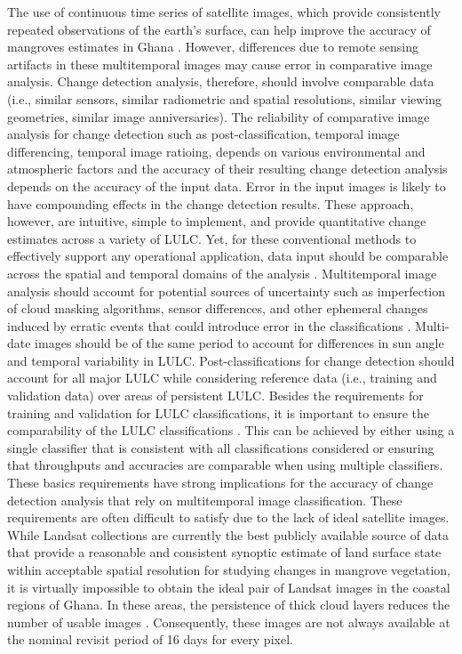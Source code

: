 \documentclass[12pt,oneside,preprint,3p,authoryear,times]{elsarticle} %
\begin{document}
The use of continuous time series of satellite images, which provide
consistently repeated observations of the earth's surface, can help
improve the accuracy of mangroves estimates in Ghana
\citep{Lambin-and-Strahlers-1994, Verbesselt-et-al-2010, Zhu-and-Woodcock-2014}.
However, differences due to remote sensing artifacts in these
multitemporal images may cause error in comparative image analysis.
Change detection analysis, therefore, should involve comparable data
(i.e., similar sensors, similar radiometric and spatial resolutions,
similar viewing geometries, similar image anniversaries). The
reliability of comparative image analysis for change detection such as
post-classification, temporal image differencing, temporal image
ratioing, depends on various environmental and atmospheric factors and
the accuracy of their resulting change detection analysis depends on the
accuracy of the input data. Error in the input images is likely to have
compounding effects in the change detection results. These approach,
however, are intuitive, simple to implement, and provide quantitative
change estimates across a variety of LULC. Yet, for these conventional
methods to effectively support any operational application, data input
should be comparable across the spatial and temporal domains of the
analysis \citep{Lillesand-et-al-2015}. Multitemporal image analysis
should account for potential sources of uncertainty such as imperfection
of cloud masking algorithms, sensor differences, and other ephemeral
changes induced by erratic events that could introduce error in the
classifications \citep{Zhu-and-Woodcock-2014}. Multi-date images should
be of the same period to account for differences in sun angle and
temporal variability in LULC. Post-classifications for change detection
should account for all major LULC while considering reference data
(i.e., training and validation data) over areas of persistent LULC.
Besides the requirements for training and validation for LULC
classifications, it is important to ensure the comparability of the LULC
classifications \citep{Lillesand-et-al-2015, Zhu-and-Woodcock-2014}.
This can be achieved by either using a single classifier that is
consistent with all classifications considered or ensuring that
throughputs and accuracies are comparable when using multiple
classifiers. These basics requirements have strong implications for the
accuracy of change detection analysis that rely on multitemporal image
classification. These requirements are often difficult to satisfy due to
the lack of ideal satellite images. While Landsat collections are
currently the best publicly available source of data that provide a
reasonable and consistent synoptic estimate of land surface state within
acceptable spatial resolution for studying changes in mangrove
vegetation, it is virtually impossible to obtain the ideal pair of
Landsat images in the coastal regions of Ghana. In these areas, the
persistence of thick cloud layers reduces the number of usable images
\citep{Rubin-et-al-1999}. Consequently, these images are not always
available at the nominal revisit period of 16 days for every pixel.
\end{document}
